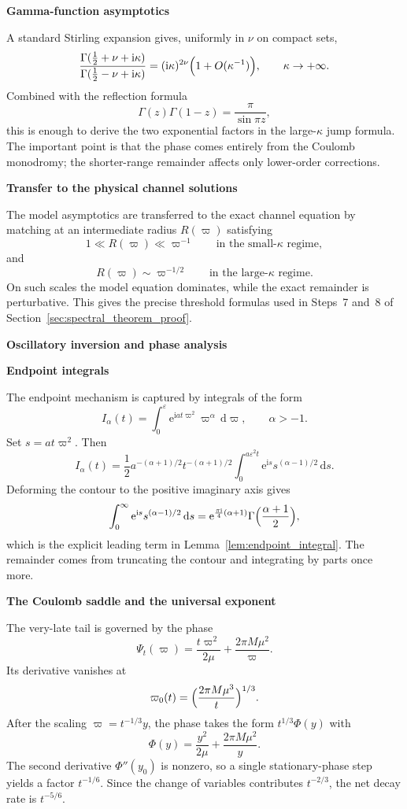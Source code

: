 \documentclass[12pt]{article}
\numberwithin{equation}{section}
\theoremstyle{plain}
\theoremstyle{definition}
\theoremstyle{remark}
\newcommand{\ii}{\mathrm i}
\newcommand{\ee}{\mathrm e}
\newcommand{\dd}{\mathrm d}
\newcommand{\vp}{\varpi}
\newcommand{\kap}{\kappa}
\newcommand{\eps}{\varepsilon}
\newcommand{\appheading}[1]{\par\medskip\noindent\textbf{#1}\par\smallskip\noindent}
\newcommand{\applabelheading}[2]{\par\medskip\phantomsection\label{#2}\noindent\textbf{#1}\par\smallskip\noindent}
\begin{document}
\appheading{Gamma-function asymptotics}

A standard Stirling expansion gives, uniformly in $\nu$ on compact sets,
\begin{equation}\label{eq:app_gamma_stirling}
   \frac{\Gamma(\frac12+\nu+\ii\kap)}{\Gamma(\frac12-\nu+\ii\kap)}
   =
   (\ii\kap)^{2\nu}\Bigl(1+O(\kap^{-1})\Bigr),
   \qquad
   \kap\to+\infty.
\end{equation}
Combined with the reflection formula
\[
   \Gamma(z)\Gamma(1-z)=\frac{\pi}{\sin\pi z},
\]
this is enough to derive the two exponential factors in the large-$\kap$ jump formula.  The important point is that the phase comes entirely from the Coulomb monodromy; the shorter-range remainder affects only lower-order corrections.

\appheading{Transfer to the physical channel solutions}

The model asymptotics are transferred to the exact channel equation by matching at an intermediate radius $R(\vp)$ satisfying
\[
   1\ll R(\vp)\ll \vp^{-1}
   \qquad\text{in the small-$\kap$ regime},
\]
and
\[
   R(\vp)\sim \vp^{-1/2}
   \qquad\text{in the large-$\kap$ regime}.
\]
On such scales the model equation dominates, while the exact remainder is perturbative.  This gives the precise threshold formulas used in Steps~7 and~8 of Section~\ref{sec:spectral_theorem_proof}.

\applabelheading{Oscillatory inversion and phase analysis}{app:phase_analysis}
\appheading{Endpoint integrals}

The endpoint mechanism is captured by integrals of the form
\[
   I_\alpha(t)=\int_0^\eps \ee^{\ii a t\vp^2}\vp^\alpha\,\dd\vp,
   \qquad \alpha>-1.
\]
Set $s=at\vp^2$.  Then
\[
   I_\alpha(t)=\frac12 a^{-(\alpha+1)/2}t^{-(\alpha+1)/2}
   \int_0^{a\eps^2 t}\ee^{\ii s}s^{(\alpha-1)/2}\,\dd s.
\]
Deforming the contour to the positive imaginary axis gives
\[
   \int_0^\infty \ee^{\ii s}s^{(\alpha-1)/2}\,\dd s
   =
   \ee^{\frac{\pi\ii}{4}(\alpha+1)}
   \Gamma\Bigl(\frac{\alpha+1}{2}\Bigr),
\]
which is the explicit leading term in Lemma~\ref{lem:endpoint_integral}.  The remainder comes from truncating the contour and integrating by parts once more.

\appheading{The Coulomb saddle and the universal exponent}

The very-late tail is governed by the phase
\[
   \Psi_t(\vp)=\frac{t\vp^2}{2\mu}+\frac{2\pi M\mu^2}{\vp}.
\]
Its derivative vanishes at
\[
   \vp_0(t)=\Bigl(\frac{2\pi M\mu^3}{t}\Bigr)^{1/3}.
\]
After the scaling $\vp=t^{-1/3}y$, the phase takes the form $t^{1/3}\Phi(y)$ with
\[
   \Phi(y)=\frac{y^2}{2\mu}+\frac{2\pi M\mu^2}{y}.
\]
The second derivative $\Phi''(y_0)$ is nonzero, so a single stationary-phase step yields a factor $t^{-1/6}$.  Since the change of variables contributes $t^{-2/3}$, the net decay rate is $t^{-5/6}$.
\end{document}
